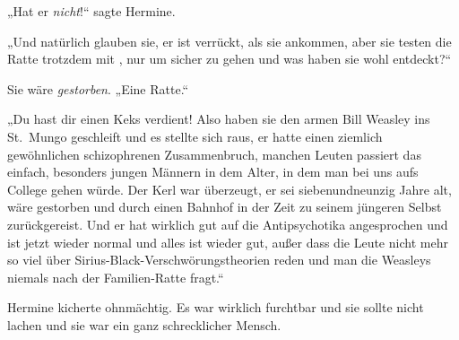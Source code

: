 „Hat er \emph{nicht}!“ sagte Hermine.

„Und natürlich glauben sie, er ist verrückt, als sie ankommen, aber sie testen die Ratte trotzdem mit , nur um sicher zu gehen und was haben sie wohl entdeckt?“%

Sie wäre \emph{gestorben}.
„Eine Ratte.“

„Du hast dir einen Keks verdient! Also haben sie den armen Bill Weasley ins St.~Mungo geschleift und es stellte sich raus, er hatte einen ziemlich gewöhnlichen schizophrenen Zusammenbruch, manchen Leuten passiert das einfach, besonders jungen Männern in dem Alter, in dem man bei uns aufs College gehen würde. Der Kerl war überzeugt, er sei siebenundneunzig Jahre alt, wäre gestorben und durch einen Bahnhof in der Zeit zu seinem jüngeren Selbst zurückgereist. Und er hat wirklich gut auf die Antipsychotika angesprochen und ist jetzt wieder normal und alles ist wieder gut, außer dass die Leute nicht mehr so viel über Sirius-Black-Verschwörungstheorien reden und man die Weasleys niemals nach der Familien-Ratte fragt.“

Hermine kicherte ohnmächtig. Es war wirklich furchtbar und sie sollte nicht lachen und sie war ein ganz schrecklicher Mensch.

